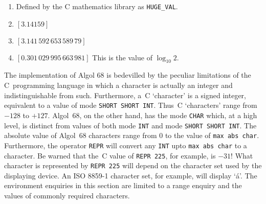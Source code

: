\begin{enumerate}
\item {}\newline
Defined by the C mathematics library as \verb|HUGE_VAL|.
\item {} $[3.14159]$
\item {} $[3.141\,592\,653\,589\,79]$
\item {} $[0.301\,029\,995\,663\,981]$\newline
This is the value of $\log_{10}2$.
\end{enumerate}

The  implementation of Algol 68 is
bedevilled by the peculiar limitations of the C~programming language
in which a character is actually an integer and indistinguishable
from such. Furthermore, a~C `character' is a signed integer,
equivalent to a value of mode \verb|SHORT SHORT INT|. Thus~C
`characters' range from $-128$ to $+127$.  Algol~68, on the other
hand, has the mode \verb|CHAR| which, at a high level, is distinct
from values of both mode \verb|INT| and mode \verb|SHORT SHORT INT|.
The absolute value of Algol~68 characters range from $0$ to the value
of \verb|max abs char|. Furthermore, the operator \verb|REPR| will
convert any \verb|INT| upto \verb|max abs char| to a character. Be
warned that the~C value of \verb|REPR 225|, for example, is $-31$!
What character is represented by \verb|REPR 225| will depend on the
character set used by the displaying device. An ISO 8859-1 character
set, for example, will display `\'a'. The environment enquiries in
this section are limited to a range enquiry and the values of
commonly required characters.
